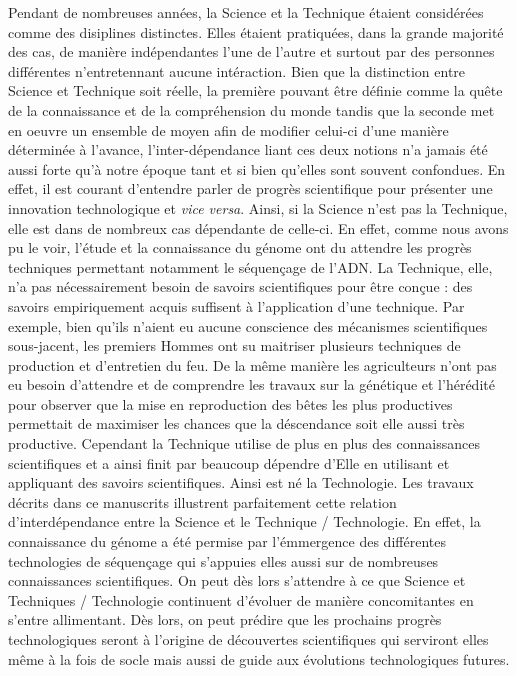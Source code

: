 \documentclass[12pt,twoside]{reedthesis}
\theoremstyle{definition}
\theoremstyle{definition}
\theoremstyle{remark}
\begin{document}
  Pendant de nombreuses années, la Science et la Technique étaient
  considérées comme des disiplines distinctes. Elles étaient pratiquées,
  dans la grande majorité des cas, de manière indépendantes l'une de
  l'autre et surtout par des personnes différentes n'entretennant aucune
  intéraction. Bien que la distinction entre Science et Technique soit
  réelle, la première pouvant être définie comme la quête de la
  connaissance et de la compréhension du monde tandis que la seconde met
  en oeuvre un ensemble de moyen afin de modifier celui-ci d'une manière
  déterminée à l'avance, l'inter-dépendance liant ces deux notions n'a
  jamais été aussi forte qu'à notre époque tant et si bien qu'elles sont
  souvent confondues. En effet, il est courant d'entendre parler de
  progrès scientifique pour présenter une innovation technologique et
  \emph{vice versa}. Ainsi, si la Science n'est pas la Technique, elle est
  dans de nombreux cas dépendante de celle-ci. En effet, comme nous avons
  pu le voir, l'étude et la connaissance du génome ont du attendre les
  progrès techniques permettant notamment le séquençage de l'ADN. La
  Technique, elle, n'a pas nécessairement besoin de savoirs scientifiques
  pour être conçue : des savoirs empiriquement acquis suffisent à
  l'application d'une technique. Par exemple, bien qu'ils n'aient eu
  aucune conscience des mécanismes scientifiques sous-jacent, les premiers
  Hommes ont su maitriser plusieurs techniques de production et
  d'entretien du feu. De la même manière les agriculteurs n'ont pas eu
  besoin d'attendre et de comprendre les travaux sur la génétique et
  l'hérédité pour observer que la mise en reproduction des bêtes les plus
  productives permettait de maximiser les chances que la déscendance soit
  elle aussi très productive. Cependant la Technique utilise de plus en
  plus des connaissances scientifiques et a ainsi finit par beaucoup
  dépendre d'Elle en utilisant et appliquant des savoirs scientifiques.
  Ainsi est né la Technologie. Les travaux décrits dans ce manuscrits
  illustrent parfaitement cette relation d'interdépendance entre la
  Science et le Technique / Technologie. En effet, la connaissance du
  génome a été permise par l'émmergence des différentes technologies de
  séquençage qui s'appuies elles aussi sur de nombreuses connaissances
  scientifiques. On peut dès lors s'attendre à ce que Science et
  Techniques / Technologie continuent d'évoluer de manière concomitantes
  en s'entre allimentant. Dès lors, on peut prédire que les prochains
  progrès technologiques seront à l'origine de découvertes scientifiques
  qui serviront elles même à la fois de socle mais aussi de guide aux
  évolutions technologiques futures.
  
\end{document}
